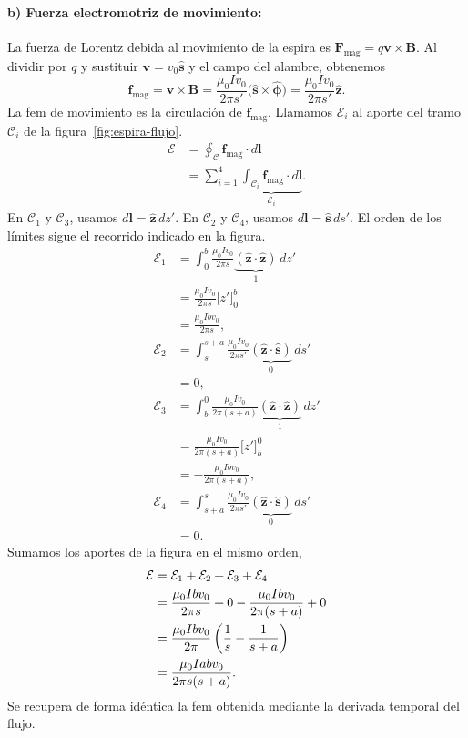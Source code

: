 \documentclass[11pt]{article}
\begin{document}
\paragraph{b) Fuerza electromotriz de movimiento:}
La fuerza de Lorentz debida al movimiento de la espira es
$\mathbf F_{\text{mag}}=q\mathbf v\times\mathbf B$. Al dividir
por $q$ y sustituir $\mathbf v=v_0\hat{\mathbf s}$ y el campo
del alambre, obtenemos
\[
    \mathbf f_{\text{mag}}
    =\mathbf v\times\mathbf B
    =\frac{\mu_0 I v_0}{2\pi s'}
       \bigl(\hat{\mathbf s}\times\hat{\boldsymbol\phi}\bigr)
    =\frac{\mu_0 I v_0}{2\pi s'}\hat{\mathbf z}.
\]
La fem de movimiento es la circulación de $\mathbf f_{\mathrm{mag}}$.
Llamamos $\mathcal E_i$ al aporte del tramo $\mathcal C_i$ de la
figura~\ref{fig:espira-flujo}.
\begin{align*}
    \mathcal E
    &=\oint_{\mathcal C}\mathbf f_{\mathrm{mag}}\cdot d\mathbf l\\
    &=\sum_{i=1}^4
      \underbrace{\int_{\mathcal C_i}\mathbf f_{\mathrm{mag}}
        \cdot d\mathbf l}_{\mathcal E_i}.
\end{align*}
En $\mathcal C_1$ y $\mathcal C_3$, usamos
$d\mathbf l=\hat{\mathbf z}\,dz'$. En $\mathcal C_2$ y $\mathcal C_4$,
usamos $d\mathbf l=\hat{\mathbf s}\,ds'$. El orden de los límites
sigue el recorrido indicado en la figura.
\begin{align*}
    \mathcal E_1
    &=\int_0^b\frac{\mu_0 I v_0}{2\pi s}
      \underbrace{(\hat{\mathbf z}\cdot\hat{\mathbf z})}_{1}\,dz'\\
    &=\frac{\mu_0 I v_0}{2\pi s}\bigl[z'\bigr]_0^b\\
    &=\frac{\mu_0 I b v_0}{2\pi s},\\[3pt]
    \mathcal E_2
    &=\int_s^{s+a}\frac{\mu_0 I v_0}{2\pi s'}
      \underbrace{(\hat{\mathbf z}\cdot\hat{\mathbf s})}_{0}\,ds'\\
    &=0,\\[3pt]
    \mathcal E_3
    &=\int_b^0\frac{\mu_0 I v_0}{2\pi(s+a)}
      \underbrace{(\hat{\mathbf z}\cdot\hat{\mathbf z})}_{1}\,dz'\\
    &=\frac{\mu_0 I v_0}{2\pi(s+a)}\bigl[z'\bigr]_b^0\\
    &=-\frac{\mu_0 I b v_0}{2\pi(s+a)},\\[3pt]
    \mathcal E_4
    &=\int_{s+a}^s\frac{\mu_0 I v_0}{2\pi s'}
      \underbrace{(\hat{\mathbf z}\cdot\hat{\mathbf s})}_{0}\,ds'\\
    &=0.
\end{align*}
Sumamos los aportes de la figura en el mismo orden,
\begin{align}
    \mathcal E
    &=\mathcal E_1+\mathcal E_2+\mathcal E_3+\mathcal E_4
      \notag\\
    &=\frac{\mu_0 I b v_0}{2\pi s}
      +0-\frac{\mu_0 I b v_0}{2\pi(s+a)}+0
      \notag\\
    &=\frac{\mu_0 I b v_0}{2\pi}
       \left(\frac{1}{s}-\frac{1}{s+a}\right)
      \notag\\
    &=\frac{\mu_0 I a b v_0}{2\pi s(s+a)}.
    \label{ind:fem-movimiento}
\end{align}
Se recupera de forma idéntica la fem obtenida mediante la derivada temporal del flujo.
\end{document}
